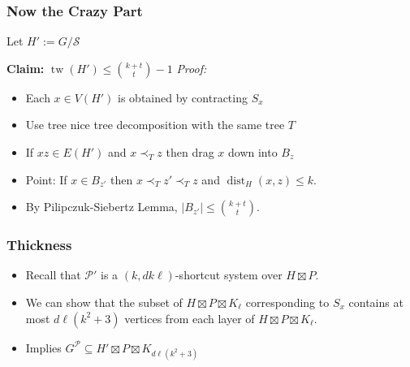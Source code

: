 \documentclass[xcolor=dvipsnames]{beamer}
\DeclareMathOperator{\tw}{tw}
\begin{document}
\begin{frame}
  \frametitle{Now the Crazy Part}
  
    Let $H':=G/\mathcal{S}$
    
    \textbf{Claim:} $\tw(H')\le\binom{k+t}{t}-1$
    \vspace{1cm}
    \textit{Proof:}
    \begin{itemize}
      \item Each $x\in V(H')$ is obtained by contracting $S_x$
      \item Use tree nice tree decomposition with the same tree $T$
      \item If $xz\in E(H')$ and $x\prec_T z$ then drag $x$ down into $B_z$
      \item Point: If $x\in B_{z'}$ then $x\prec_T z'\prec_T z$ and $\mathop{dist}_{H}(x,z)\le k$.  
      \item By Pilipczuk-Siebertz Lemma, $|B_{z'}|\le \binom{k+t}{t}$.
    \end{itemize}
\end{frame}


\begin{frame}
  \frametitle{Thickness}
  
  \begin{itemize}
    \item Recall that $\mathcal{P'}$ is a $(k,dk\ell)$-shortcut system over $H\boxtimes P$.
    \item We can show that the subset of $H\boxtimes P\boxtimes K_{\ell}$ corresponding to $S_x$ contains at most $d\ell(k^2+3)$ vertices from each layer of $H\boxtimes P\boxtimes K_{\ell}$.
    \item Implies $G^{\mathcal{P}}\subseteq H'\boxtimes P\boxtimes K_{d\ell(k^2+3)}$
  \end{itemize}
\end{frame}
\end{document}
